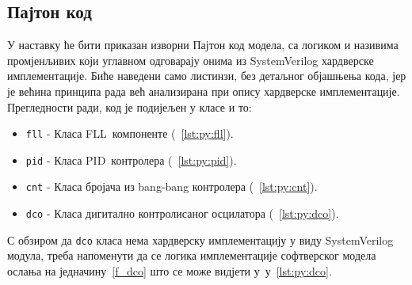 \documentclass[master]{finthesis}
\newcommand*{\prog}[1]{\texttt{#1}}
\def \FLL  {FLL} %
\def \PID  {PID} %
\begin{document}
\subsection{Пајтон код} \label{section:python_model:source}
У наставку ће бити приказан изворни Пајтон код модела, са логиком и називима промјенљивих који углавном одговарају онима из SystemVerilog хардверске имплементације. Биће наведени само листинзи, без детаљног објашњења кода, јер је већина принципа рада већ анализирана при опису хардверске имплементације. Прегледности ради, код је подијељен у класе и то:
\begin{itemize}
	\item \prog{fll} - Класа \FLL\ компоненте (\lstlistingname~\ref{lst:py:fll}).
	\item \prog{pid} - Класа \PID\ контролера (\lstlistingname~\ref{lst:py:pid}).
	\item \prog{cnt} - Класа бројача из bang-bang контролера (\lstlistingname~\ref{lst:py:cnt}).
	\item \prog{dco} - Класа дигитално контролисаног осцилатора (\lstlistingname~\ref{lst:py:dco}).
\end{itemize}
С обзиром да \prog{dco} класа нема хардверску имплементацију у виду SystemVerilog модула, треба напоменути да се логика имплементације софтверског модела ослања на једначину~\ref{f_dco} што се може видјети у~\lstlistingname{у}~\ref{lst:py:dco}.
\end{document}
